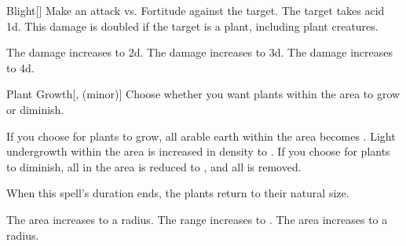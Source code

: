 \lowercase{\hypertarget{spell:Blight}{}}\label{spell:Blight}
\begin{freeability}[Rank 2]{\hypertarget{spell:Blight}{Blight}}[]
Make an attack vs. Fortitude against the target.
\hit The target takes acid  \plus1d.
This damage is doubled if the target is a plant, including plant creatures.

\rankline
{} The damage increases to  \plus2d.
 The damage increases to  \plus3d.
 The damage increases to  \plus4d.

\end{freeability}
\vspace{0.25em}



\lowercase{\hypertarget{spell:Plant Growth}{}}\label{spell:Plant Growth}
\begin{freeability}[Rank 2]{\hypertarget{spell:Plant Growth}{Plant Growth}}[,  (minor)]
Choose whether you want plants within the area to grow or diminish.

If you choose for plants to grow, all arable earth within the area becomes .
Light undergrowth within the area is increased in density to .
If you choose for plants to diminish, all  in the area is reduced to , and all  is removed.

When this spell's duration ends, the plants return to their natural size.

\rankline
{} The area increases to a \arealarge radius.
 The range increases to \rnglong.
 The area increases to a \areahuge radius.

\end{freeability}
\vspace{0.25em}



